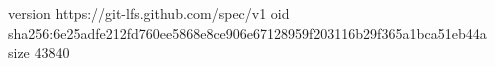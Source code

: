 version https://git-lfs.github.com/spec/v1
oid sha256:6e25adfe212fd760ee5868e8ce906e67128959f203116b29f365a1bca51eb44a
size 43840

